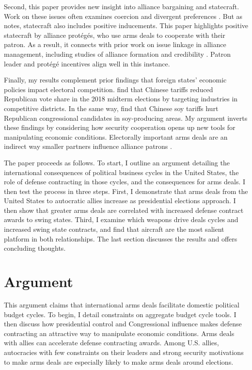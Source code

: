 \documentclass[12pt]{article}
\begin{document}
Second, this paper provides new insight into alliance bargaining and statecraft. 
Work on these issues often examines coercion and divergent preferences \citep{Oatley2015, WolfordKim2017, Blankenship2020, Beckeretal2023}. %
But as \citet{Baldwin2020} notes, statecraft also includes positive inducements. 
This paper highlights positive statecraft by alliance prot{\'e}g{\'e}s, who use arms deals to cooperate with their patron.
As a result, it connects with prior work on issue linkage in alliance management, including studies of alliance formation \citep{Poast2012} and credibility \citep{Davis2008, Poast2013}.
Patron leader and prot{\'e}g{\'e} incentives align well in this instance.


Finally, my results complement prior findings that foreign states' economic policies impact electoral competition. 
\citet{KimMargalit2021} find that Chinese tariffs reduced Republican vote share in the 2018 midterm elections by targeting industries in competitive districts.
In the same way, \citet{ChyzhUrbatsch2021} find that Chinese soy tariffs hurt Republican congressional candidates in soy-producing areas. 
My argument inverts these findings by considering how security cooperation opens up new tools for manipulating economic conditions. 
Electorally important arms deals are an indirect way smaller partners influence alliance patrons \citep{Keohane1971}.


The paper proceeds as follows. 
To start, I outline an argument detailing the international consequences of political business cycles in the United States, the role of defense contracting in those cycles, and the consequences for arms deals. 
I then test the process in three steps. 
First, I demonstrate that arms deals from the United States to autocratic allies increase as presidential elections approach.
I then show that greater arms deals are correlated with increased defense contract awards to swing states.
Third, I examine which weapons drive deals cycles and increased swing state contracts, and find that aircraft are the most salient platform in both relationships. 
The last section discusses the results and offers concluding thoughts.


\section{Argument}


This argument claims that international arms deals facilitate domestic political budget cycles.
To begin, I detail constraints on aggregate budget cycle tools.
I then discuss how presidential control and Congressional influence makes defense contracting an attractive way to manipulate economic conditions. 
Arms deals with allies can accelerate defense contracting awards. 
Among U.S. allies, autocracies with few constraints on their leaders and strong security motivations to make arms deals are especially likely to make arms deals around elections.
\end{document}
